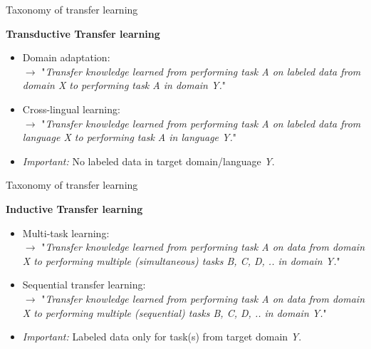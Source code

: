 \documentclass[11pt,compress,t,notes=noshow, xcolor=table]{beamer}
\begin{document}
\begin{frame}{Taxonomy of transfer learning \href{https://ruder.io/thesis/}{}}

\vfill

	\textbf{Transductive Transfer learning}

	\begin{itemize}
		\item Domain adaptation:\\
					$\rightarrow$ "\textit{Transfer knowledge learned from performing task A on labeled data from domain X to performing task A in domain Y.}"\\\mbox{}
		\item Cross-lingual learning:\\
					$\rightarrow$ "\textit{Transfer knowledge learned from performing task A on labeled data from language X to performing task A in language Y.}"\\\mbox{}
		\item \textit{Important:} No labeled data in target domain/language \textit{Y}.
	\end{itemize}
	
\vfill

\end{frame}


\begin{frame}{Taxonomy of transfer learning \href{https://ruder.io/thesis/}{}}

\vfill

	\textbf{Inductive Transfer learning}

	\begin{itemize}
		\item Multi-task learning:\\
					$\rightarrow$ "\textit{Transfer knowledge learned from performing task A on data from domain X to performing multiple (simultaneous) tasks B, C, D, .. in domain Y.}"\\\mbox{}
		\item Sequential transfer learning:\\
					$\rightarrow$ "\textit{Transfer knowledge learned from performing task A on data from domain X to performing multiple (sequential) tasks B, C, D, .. in domain Y.}"\\\mbox{}
		\item \textit{Important:} Labeled data only for task(s) from target domain \textit{Y}.
	\end{itemize}
	
\vfill

\end{frame}
\end{document}
